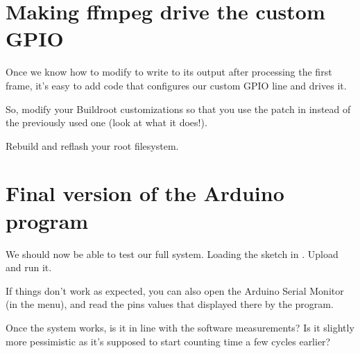 \section{Making ffmpeg drive the custom GPIO}

Once we know how to modify  to write to its output after
processing the first frame, it's easy to add code that configures our
custom GPIO line and drives it.

So, modify your Buildroot customizations so that you use the patch in
instead of the previously used one (look at what it does!).

Rebuild and reflash your root filesystem.

\section{Final version of the Arduino program}

We should now be able to test our full system.  Loading the sketch in
. Upload and run it.

If things don't work as expected, you can also open the Arduino Serial
Monitor (in the  menu), and read the pins values that
displayed there by the program.

Once the system works, is it in line with the software measurements?
Is it slightly more pessimistic as it's supposed to start counting
time a few cycles earlier?

